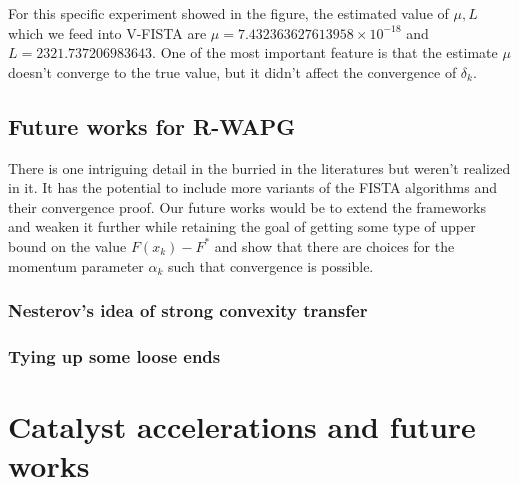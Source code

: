 \documentclass[12pt]{article}
\begin{document}
        For this specific experiment showed in the figure, the estimated value of $\mu, L$ which we feed into V-FISTA are $\mu = 7.432363627613958\times 10^{-18}$ and $L = 2321.737206983643$. 
        One of the most important feature is that the estimate $\mu$ doesn't converge to the true value, but it didn't affect the convergence of $\delta_k$. 

    \subsection{Future works for R-WAPG}
        There is one intriguing detail in the burried in the literatures but weren't realized in it. 
        It has the potential to include more variants of the FISTA algorithms and their convergence proof. 
        Our future works would be to extend the frameworks and weaken it further while retaining the goal of getting some type of upper bound on the value $F(x_k) - F^*$ and show that there are choices for the momentum parameter $\alpha_k$ such that convergence is possible. 
        \subsubsection{Nesterov's idea of strong convexity transfer}
        \subsubsection{Tying up some loose ends}

\section{Catalyst accelerations and future works}\label{sec:catalyst}
\end{document}
